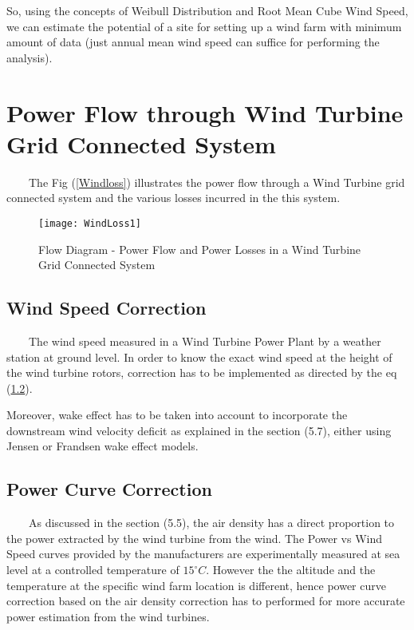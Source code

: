 So, using the concepts of Weibull Distribution and Root Mean Cube Wind Speed, we can estimate the potential of a site for setting up a wind farm with minimum amount of data (just annual mean wind speed can suffice for performing the analysis).\\

\newpage 
		
\section{Power Flow through Wind Turbine Grid Connected System}
\
\
\
\
The Fig (\ref{Windloss}) illustrates the power flow through a Wind Turbine grid connected system and the various losses incurred in the this system.

\begin{figure}[H]
\centering
\texttt{[image: WindLoss1]}
\caption{Flow Diagram - Power Flow and Power Losses in a Wind Turbine Grid Connected System}
\label{WindLoss} %
\end{figure}

\subsection{Wind Speed Correction}
\
\
\
\
The wind speed measured in a Wind Turbine Power Plant by a weather station at ground level. In order to know the exact wind speed at the height of the wind turbine rotors, correction has to be implemented as directed by the eq (\ref{}).

Moreover, wake effect has to be taken into account to incorporate the downstream wind velocity deficit as explained in the section (5.7), either using Jensen or Frandsen wake effect models.

\subsection{Power Curve Correction}
\
\
\
\ 
As discussed in the section (5.5), the air density has a direct proportion to the power extracted by the wind turbine from the wind. The Power vs Wind Speed curves provided by the manufacturers are experimentally measured at sea level at a controlled temperature of $15^{\circ}C$. However the the altitude and the temperature at the specific wind farm location is different, hence power curve correction based on the air density correction has to performed for more accurate power estimation from the wind turbines.

